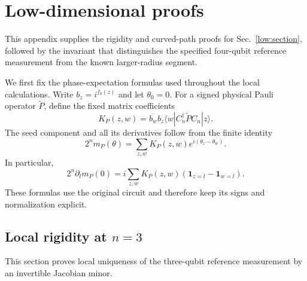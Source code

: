\section{Low-dimensional proofs}
\label{low:appendix}

This appendix supplies the rigidity and curved-path proofs for Sec.~\ref{low:section}, followed by the invariant that distinguishes the specified four-qubit reference measurement from the known larger-radius segment.

We first fix the phase-expectation formulas used throughout the local calculations. Write $b_z=i^{f_0(z)}$ and let $\theta_0=0$.  For a signed physical
Pauli operator $\widetilde P$, define the fixed matrix coefficients
\begin{equation}
 K_P(z,w)=\overline{b_w}b_z
 \langle w|C_n^\dagger\widetilde P C_n|z\rangle.
 \label{low:finite-coeff}
\end{equation}
The seed component and all its derivatives follow from the finite identity
\begin{equation}
 2^n m_P(\theta)=\sum_{z,w}K_P(z,w)e^{i(\theta_z-\theta_w)}.
 \label{low:finite-sum}
\end{equation}
In particular,
\begin{equation}
 2^n\partial_lm_P(0)
 =i\sum_{z,w}K_P(z,w)
 (\mathbf1_{z=l}-\mathbf1_{w=l}).
 \label{low:jacobian-formula}
\end{equation}
These formulas use the original circuit and therefore keep its signs and
normalization explicit.

\subsection{Local rigidity at \texorpdfstring{$n=3$}{n=3}}
\label{low:app-rigidity}

This section proves local uniqueness of the three-qubit reference measurement by an invertible Jacobian minor.

